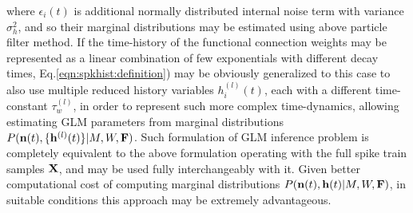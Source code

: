 where $\epsilon_i(t)$ is additional normally distributed internal noise term with variance $\sigma^2_h$, and so their marginal distributions may be estimated using above particle filter method. If the time-history of the  functional connection weights may be represented as a linear combination of few exponentials with different decay times, Eq.\eqref{eqn:spkhist:definition}) may be obviously generalized to this case to also use multiple reduced history variables $h_i^{(l)}(t)$, each with a different time-constant $\tau^{(l)}_w$, in order to represent such more complex time-dynamics, allowing estimating GLM parameters from marginal distributions $P({\bf n}(t), \{{\bf h}^{(l)}(t)\}|M, W, {\bf F})$.  Such formulation of GLM inference problem is completely equivalent to the above formulation operating with the full spike train samples ${\bf X}$, and may be used fully interchangeably with it. Given better computational cost of computing marginal distributions $P({\bf n}(t), {\bf h}(t)|M, W, {\bf F})$, in suitable conditions this approach may be extremely advantageous.